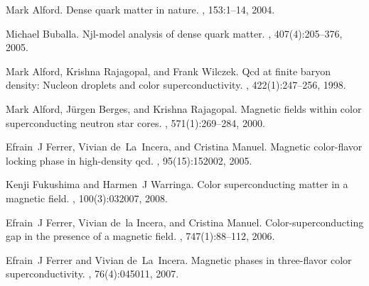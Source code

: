 \documentclass[12pt]{article}
\begin{document}
\begin{thebibliography}{99}

%

Mark Alford.
\newblock Dense quark matter in nature.
, 153:1--14, 2004.

Michael Buballa.
\newblock Njl-model analysis of dense quark matter.
, 407(4):205--376, 2005.

Mark Alford, Krishna Rajagopal, and Frank Wilczek.
\newblock Qcd at finite baryon density: Nucleon droplets and color
  superconductivity.
, 422(1):247--256, 1998.

Mark Alford, J{\"u}rgen Berges, and Krishna Rajagopal.
\newblock Magnetic fields within color superconducting neutron star cores.
, 571(1):269--284, 2000.

Efrain~J Ferrer, Vivian de~La~Incera, and Cristina Manuel.
\newblock Magnetic color-flavor locking phase in high-density qcd.
, 95(15):152002, 2005.

Kenji Fukushima and Harmen~J Warringa.
\newblock Color superconducting matter in a magnetic field.
, 100(3):032007, 2008.

Efrain~J Ferrer, Vivian de~la Incera, and Cristina Manuel.
\newblock Color-superconducting gap in the presence of a magnetic field.
, 747(1):88--112, 2006.

Efrain~J Ferrer and Vivian de~La~Incera.
\newblock Magnetic phases in three-flavor color superconductivity.
, 76(4):045011, 2007.



\end{thebibliography}
\end{document}
